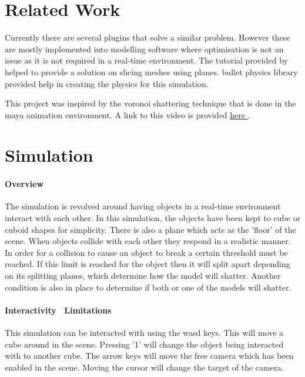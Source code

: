 \documentclass[conference,backref=page]{acmsiggraph}
\begin{document}
\section{Related Work}

Currently there are several plugins that solve a similar problem. However these are mostly implemented into modelling software where optimisation is not an issue as it is not required in a real-time environment. The tutorial provided by \cite{voronoi} helped to provide a solution on slicing meshes using planes. \cite{Physics} bullet physics library provided help in creating the physics for this simulation. 

This project was inspired by the voronoi shattering technique that is done in the maya animation environment. A link to this video is provided \href{https://www.youtube.com/watch?v=FIPu9_OGFgc}{\color{blue}here \color{black}}.

\section{Simulation}

\paragraph{Overview} \hfill

The simulation is revolved around having objects in a real-time environment interact with each other. In this simulation, the objects have been kept to cube or cuboid shapes for simplicity. There is also a plane which acts as the 'floor' of the scene. When objects collide with each other they respond in a realistic manner. In order for a collision to cause an object to break a certain threshold must be reached. If this limit is reached for the object then it will split apart depending on its splitting planes, which determine how the model will shatter. Another condition is also in place to determine if both or one of the models will shatter.

\paragraph{Interactivity \ Limitations} \hfill

This simulation can be interacted with using the wasd keys. This will move a cube around in the scene. Pressing '1' will change the object being interacted with to another cube. The arrow keys will move the free camera which has been enabled in the scene. Moving the cursor will change the target of the camera. 
\end{document}
